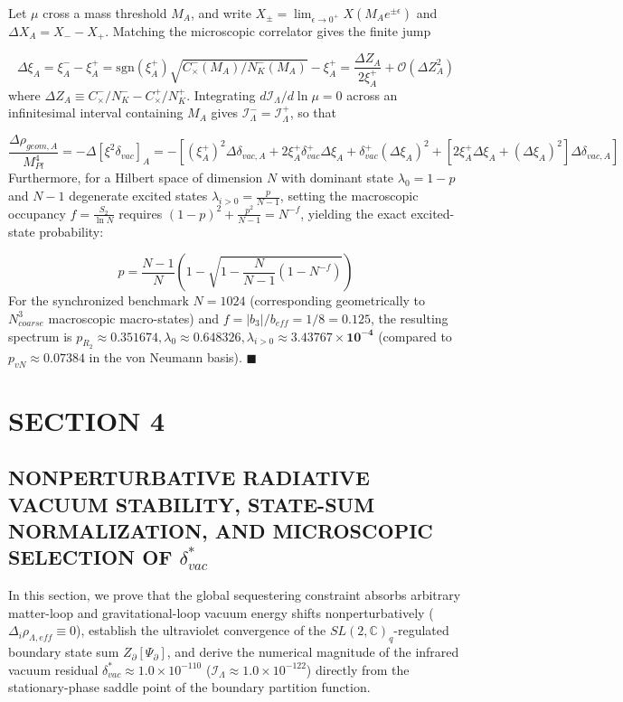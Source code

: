 \documentclass[aps,prd,onecolumn,superscriptaddress,nofootinbib,longbibliography,10pt]{revtex4-2}
\begin{document}
{{  Let \(\mu\) cross a mass threshold \(M_A\), and write \(X_\pm = \lim_{\epsilon\to 0^+} X(M_A e^{\pm\epsilon})\) and \(\Delta X_A = X_- - X_+\). Matching the microscopic correlator gives the finite jump


  \[ \Delta\xi_A = \xi_A^- - \xi_A^+ = \text{sgn}(\xi_A^+)\sqrt{C_\times^-(M_A)/N_K^-(M_A)} - \xi_A^+ = \frac{\Delta Z_A}{2\xi_A^+} + \mathcal{O}(\Delta Z_A^2) \]
  where \(\Delta Z_A \equiv C_\times^-/N_K^- - C_\times^+/N_K^+\). Integrating \(d\mathcal{I}_\Lambda/d\ln\mu = 0\) across an infinitesimal interval containing \(M_A\) gives \(\mathcal{I}_\Lambda^- = \mathcal{I}_\Lambda^+\), so that


  \[ \frac{\Delta\rho_{geom,A}}{M_{Pl}^4} = -\Delta[\xi^2\delta_{vac}]_A = -\left[ (\xi_A^+)^2\Delta\delta_{vac,A} + 2\xi_A^+\delta_{vac}^+\Delta\xi_A + \delta_{vac}^+(\Delta\xi_A)^2 + [2\xi_A^+\Delta\xi_A + (\Delta\xi_A)^2]\Delta\delta_{vac,A} \right] \]
  Furthermore, for a Hilbert space of dimension \(N\) with dominant state \(\lambda_0 = 1 - p\) and \(N - 1\) degenerate excited states \(\lambda_{i>0} = \frac{p}{N-1}\), setting the macroscopic occupancy \(f = \frac{S_2}{\ln N}\) requires \((1-p)^2 + \frac{p^2}{N-1} = N^{-f}\), yielding the exact excited-state probability:


  \[ p = \frac{N - 1}{N}\left( 1 - \sqrt{1 - \frac{N}{N - 1}(1 - N^{-f})} \right) \]
  For the synchronized benchmark \(N = 1024\) (corresponding geometrically to \(N_{coarse}^3\) macroscopic macro-states) and \(f = |b_3|/b_{eff} = 1/8 = 0.125\), the resulting spectrum is \(p_{R_2} \approx \mathbf{0.351674}, \lambda_0 \approx \mathbf{0.648326}, \lambda_{i>0} \approx \mathbf{3.43767 \times 10^{-4}}\) (compared to \(p_{vN} \approx 0.07384\) in the von Neumann basis). \(\blacksquare\)




 

  
\section*{SECTION 4}

  
\subsection*{NONPERTURBATIVE RADIATIVE VACUUM STABILITY, STATE-SUM NORMALIZATION, AND MICROSCOPIC SELECTION OF \(\delta_{vac}^*\)}

  In this section, we prove that the global sequestering constraint absorbs arbitrary matter-loop and gravitational-loop vacuum energy shifts nonperturbatively (\(\Delta_i \rho_{\Lambda,eff} \equiv 0\)), establish the ultraviolet convergence of the \(SL(2,\mathbb{C})_q\)-regulated boundary state sum \(Z_\partial[\Psi_\partial]\), and derive the numerical magnitude of the infrared vacuum residual \(\delta_{vac}^* \approx 1.0 \times 10^{-110}\) (\(\mathcal{I}_\Lambda \approx 1.0 \times {10^{-122}}\)) directly from the stationary-phase saddle point of the boundary partition function.


}}
\end{document}
